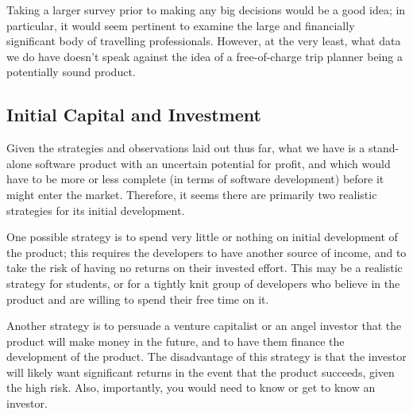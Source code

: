 Taking a larger survey prior to making any big decisions would be a good idea;
in particular, it would seem pertinent to examine the large and financially
significant body of travelling professionals. However, at the very least,
what data we do have doesn't speak against the idea of a free-of-charge trip
planner being a potentially sound product.

\subsection{Initial Capital and Investment}

Given the strategies and observations laid out thus far, what we have is a
stand-alone software product with an uncertain potential for profit, and which
would have to be more or less complete (in terms of software development)
before it might enter the market. Therefore, it seems there are primarily two
realistic strategies for its initial development.

One possible strategy is to spend very little or nothing on initial
development of the product; this requires the developers to have another
source of income, and to take the risk of having no returns on their invested
effort. This may be a realistic strategy for students, or for a tightly knit
group of developers who believe in the product and are willing to spend their
free time on it.

Another strategy is to persuade a venture capitalist or an angel investor
that the product will make money in the future, and to have them finance the
development of the product. The disadvantage of this strategy is that the
investor will likely want significant returns in the event that the product
succeeds, given the high risk. Also, importantly, you would need to know or
get to know an investor.
